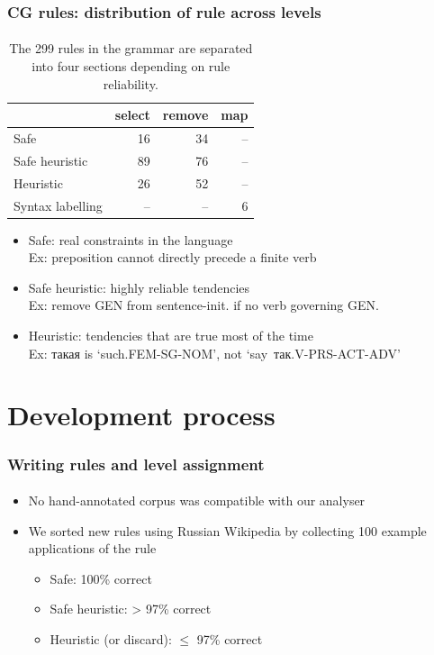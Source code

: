 \documentclass{beamer}
\newcommand{\rus}[1]{\foreignlanguage{russian}{#1}}
\begin{document}
\begin{frame}
\frametitle{CG rules: distribution of rule across levels}
\framesubtitle{}
\begin{table}
  \centering
  \begin{tabular}{lrrr}
    \hline
                     & {\sc select} & {\sc remove} & {\sc map} \\
    \hline
    Safe             &   16         &   34         &  -- \\
    Safe heuristic   &   89         &   76         &  -- \\
    Heuristic        &   26         &   52         &  -- \\
    Syntax labelling & --           & --           & 6 \\ 
    \hline
  \end{tabular}
  \caption{The 299 rules in the grammar are separated into four sections depending
      on rule reliability. }
  \label{tab:ruleDist}
\end{table}
\begin{itemize}
	\item Safe: real constraints in the language\\
		{\small Ex: preposition cannot directly precede a finite verb}
		\pause
	\item Safe heuristic: highly reliable tendencies\\ %
		{\small Ex: remove GEN from sentence-init. if no verb governing GEN.}
		\pause
	\item Heuristic: tendencies that are true most of the time\\ %
		{\small Ex: \rus{такая} is `such.FEM-SG-NOM', not `say~\rus{так}.V-PRS-ACT-ADV'}
\end{itemize}
\end{frame}


\section{Development process} %

\begin{frame}
\frametitle{Writing rules and level assignment}
\framesubtitle{}
\begin{itemize}
	\item No hand-annotated corpus was compatible with our analyser
	\pause
	\item We sorted new rules using Russian Wikipedia by collecting 100 example applications of the rule
	\pause
	\begin{itemize}
		\item Safe: 100\% correct
		\item Safe heuristic: > 97\% correct
		\item Heuristic (or discard): $\leq$ 97\% correct 
	\end{itemize}
\end{itemize}
\end{frame}
\end{document}
